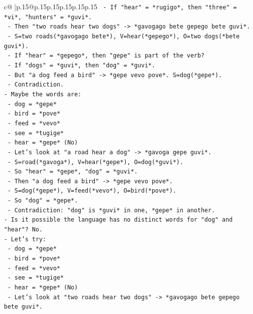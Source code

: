 \documentclass{article}
\begin{document}
{\begin{supertabular}{c@{$\;$}|p{.15\linewidth}@{}p{.15\linewidth}p{.15\linewidth}p{.15\linewidth}p{.15\linewidth}p{.15\linewidth}}
{{{\texttt{    {-} If "hear" = *rugigo*, then "three" = *vi*, "hunters" = *guvi*.} \\
\texttt{    {-} Then "two roads hear two dogs" {-}> *gavogago bete gepego bete guvi*.} \\
\texttt{      {-} S=two roads(*gavogago bete*), V=hear(*gepego*), O=two dogs(*bete guvi*).} \\
\texttt{      {-} If "hear" = *gepego*, then "gepe" is part of the verb?} \\
\texttt{      {-} If "dogs" = *guvi*, then "dog" = *guvi*.} \\
\texttt{      {-} But "a dog feed a bird" {-}> *gepe vevo pove*. S=dog(*gepe*).} \\
\texttt{      {-} Contradiction.} \\
\texttt{{-} Maybe the words are:} \\
\texttt{  {-} dog = *gepe*} \\
\texttt{  {-} bird = *pove*} \\
\texttt{  {-} feed = *vevo*} \\
\texttt{  {-} see = *tugige*} \\
\texttt{  {-} hear = *gepe* (No)} \\
\texttt{  {-} Let's look at "a road hear a dog" {-}> *gavoga gepe guvi*.} \\
\texttt{    {-} S=road(*gavoga*), V=hear(*gepe*), O=dog(*guvi*).} \\
\texttt{    {-} So "hear" = *gepe*, "dog" = *guvi*.} \\
\texttt{  {-} Then "a dog feed a bird" {-}> *gepe vevo pove*.} \\
\texttt{    {-} S=dog(*gepe*), V=feed(*vevo*), O=bird(*pove*).} \\
\texttt{    {-} So "dog" = *gepe*.} \\
\texttt{  {-} Contradiction: "dog" is *guvi* in one, *gepe* in another.} \\
\texttt{{-} Is it possible the language has no distinct words for "dog" and "hear"? No.} \\
\texttt{{-} Let's try:} \\
\texttt{  {-} dog = *gepe*} \\
\texttt{  {-} bird = *pove*} \\
\texttt{  {-} feed = *vevo*} \\
\texttt{  {-} see = *tugige*} \\
\texttt{  {-} hear = *gepe* (No)} \\
\texttt{  {-} Let's look at "two roads hear two dogs" {-}> *gavogago bete gepego bete guvi*.} \\
}}}
\end{supertabular}}
\end{document}
